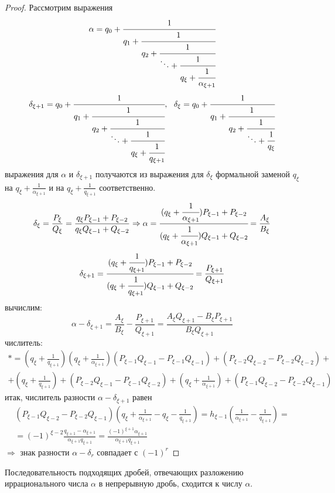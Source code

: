     \begin{proof}
        Рассмотрим выражения
        \[\alpha=q_0+\cfrac{1}{q_1+\cfrac{1}{q_2+\cfrac{1}{\ddots+\cfrac{1}{q_{\xi}+\cfrac{1}{\alpha_{\xi+1}}}}}}\]
        \[\delta_{\xi+1}=q_0+\cfrac{1}{q_1+\cfrac{1}{q_2+\cfrac{1}{\ddots+\cfrac{1}{q_{\xi}+\cfrac{1}{q_{\xi+1}}}}}},\ \ \delta_{\xi}=q_0+\cfrac{1}{q_1+\cfrac{1}{q_2+\cfrac{1}{\ddots+\cfrac{1}{q_{\xi}}}}}\]
        выражения для $\alpha$ и $\delta_{\xi+1}$ получаются из выражения для $\delta_{\xi}$ формальной заменой $q_{\xi}$ на $q_{\xi}+\frac{1}{\alpha_{\xi+1}}$ и на $q_{\xi}+\frac{1}{q_{\xi+1}}$ соответственно.
        \[\delta_{\xi}=\frac{P_{\xi}}{Q_{\xi}}=\frac{q_{\xi}P_{\xi-1}+P_{\xi-2}}{q_{\xi}Q_{\xi-1}+Q_{\xi-2}} \Rightarrow \alpha=\cfrac{(q_{\xi}+\cfrac{1}{\alpha_{\xi+1}})P_{\xi-1}+P_{\xi-2}}{(q_{\xi}+\cfrac{1}{\alpha_{\xi+1}})Q_{\xi-1}+Q_{\xi-2}}=\frac{A_{\xi}}{B_{\xi}}\]
        \[\delta_{\xi+1}=\cfrac{(q_{\xi}+\cfrac{1}{q_{\xi+1}})P_{\xi-1}+P_{\xi-2}}{(q_{\xi}+\cfrac{1}{q_{\xi+1}})Q_{\xi-1}+Q_{\xi-2}}=\frac{P_{\xi+1}}{Q_{\xi+1}}\]
        вычислим:
        \[\alpha-\delta_{\xi+1}=\frac{A_{\xi}}{B_{\xi}}-\frac{P_{\xi+1}}{Q_{\xi+1}}=\frac{A_{\xi}Q_{\xi+1}-B_{\xi}P_{\xi+1}}{B_{\xi}Q_{\xi+1}}\]
        числитель:
        \begin{multline*}
            \ast = (q_{\xi}+\frac{1}{q_{\xi+1}})(q_{\xi}+\frac{1}{\alpha_{\xi+1}})(P_{\xi-1}Q_{\xi-1}-P_{\xi-1}Q_{\xi-1})+(P_{\xi-2}Q_{\xi-2}-P_{\xi-2}Q_{\xi-2})+\\
            +(q_{\xi}+\frac{1}{q_{\xi+1}})+(P_{\xi-2}Q_{\xi-1}-P_{\xi-1}Q_{\xi-2})+(q_{\xi}+\frac{1}{\alpha_{\xi+1}})+(P_{\xi-1}Q_{\xi-2}-P_{\xi-2}Q_{\xi-1})
        \end{multline*}
        итак, числитель разности $\alpha-\delta_{\xi+1}$ равен
        \begin{multline*}
            (P_{\xi-1}Q_{\xi-2}-P_{\xi-2}Q_{\xi-1})(q_{\xi}+\frac{1}{\alpha_{\xi+1}}-q_{\xi}-\frac{1}{q_{\xi+1}})=h_{\xi-1}(\frac{1}{\alpha_{\xi+1}}-\frac{1}{q_{\xi+1}})=\\
            =(-1)^{\xi-2}\frac{q_{\xi+1}-\alpha_{\xi+1}}{\alpha_{\xi+1}q_{\xi+1}}=\frac{(-1)^{\xi+1}\alpha_{\xi+1}}{\alpha_{\xi+1}q_{\xi+1}}
        \end{multline*}
        $\Rightarrow$ знак разности $\alpha-\delta_r$ совпадает с $(-1)^r$
    \end{proof} 
    \begin{theorem}\label{th7.3}
        Последовательность подходящих дробей, отвечающих разложению иррационального числа $\alpha$ в непрерывную дробь, сходится к числу $\alpha$.
    \end{theorem} 
